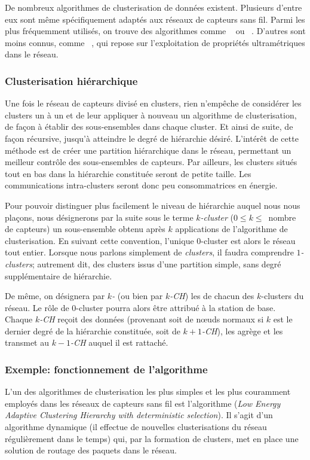 De nombreux algorithmes de clusterisation de données existent.
Plusieurs d'entre eux sont même spécifiquement adaptés aux réseaux de capteurs sans fil.
Parmi les plus fréquemment utilisés, on trouve des algorithmes comme \leach~\cite{HCB00} ou \heed~\cite{YF04}.
D'autres sont moins connus, comme \ffuca~\cite{FL11}, qui repose sur l'exploitation de propriétés ultramétriques dans le réseau.

        \subsubsection{Clusterisation hiérarchique}
Une fois le réseau de capteurs divisé en clusters, rien n'empêche de considérer les clusters un à un et de leur appliquer à nouveau un algorithme de clusterisation, de façon à établir des sous-ensembles dans chaque cluster.
Et ainsi de suite, de façon récursive, jusqu'à atteindre le degré de hiérarchie désiré.
L'intérêt de cette méthode est de créer une partition hiérarchique dans le réseau, permettant un meilleur contrôle des sous-ensembles de capteurs.
Par ailleurs, les clusters situés tout en bas dans la hiérarchie constituée seront de petite taille.
Les communications intra-clusters seront donc peu consommatrices en énergie.

Pour pouvoir distinguer plus facilement le niveau de hiérarchie auquel nous nous plaçons, nous désignerons par la suite sous le terme \textit{$k$-cluster} ($0 \leq k \leq$~nombre de capteurs) un sous-ensemble obtenu après $k$ applications de l'algorithme de clusterisation.
En suivant cette convention, l'unique $0$-cluster est alors le réseau tout entier.
Lorsque nous parlons simplement de \textit{clusters}, il faudra comprendre \textit{$1$-clusters}; autrement dit, des clusters issus d'une partition simple, sans degré supplémentaire de hiérarchie.

De même, on désignera par \textit{$k$-\ch} (ou bien par \textit{$k$-CH}) les \chs de chacun des $k$-clusters du réseau.
Le rôle de $0$-cluster pourra alors être attribué à la station de base.
Chaque \textit{$k$-CH} reçoit des données (provenant soit de nœuds normaux si $k$ est le dernier degré de la hiérarchie constituée, soit de \textit{$k+1$-CH}), les agrège et les transmet au \textit{$k-1$-CH} auquel il est rattaché.

        \subsubsection{Exemple: fonctionnement de l'algorithme \leach}
        \label{st:subsubsec:leach}
L'un des algorithmes de clusterisation les plus simples et les plus couramment employés dans les réseaux de capteurs sans fil est l'algorithme \leach (\textit{Low Energy Adaptive Clustering Hierarchy with deterministic \ch selection}).
Il s'agit d'un algorithme dynamique (il effectue de nouvelles clusterisations du réseau régulièrement dans le temps) qui, par la formation de clusters, met en place une solution de routage des paquets dans le réseau.


